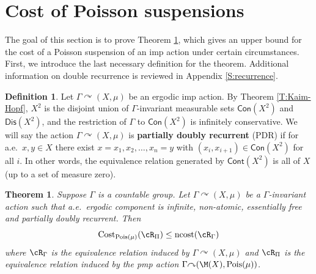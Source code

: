 \documentclass[12pt]{article}
\theoremstyle{plain}
\newtheorem{thm}{Theorem}[section]
\theoremstyle{definition}
\newtheorem{defn}{Definition}
\theoremstyle{remark}
\newtheorem{remark}{Remark}
\newcommand{\G}{\Gamma}
\newcommand\cost{{\operatorname{Cost}}}
\newcommand\Pois{\operatorname{Pois}}
\def\cc{{\curvearrowright}}
\begin{document}
\section{Cost of Poisson suspensions}\label{S:cost-Poisson}

The goal of this section is to prove Theorem \ref{T:ppp-cost}, which gives an upper bound for the cost of a Poisson suspension of an imp action under certain circumstances. First, we introduce the last necessary definition for the theorem.
Additional information on double recurrence is reviewed in Appendix \ref{S:recurrence}.

\begin{defn}
    Let $\G \cc (X,\mu)$ be an ergodic imp action. By Theorem \ref{T:Kaim-Hopf}, $X^2$ is the disjoint union of $\G$-invariant measurable sets $\mathsf{Con}(X^2)$ and $\mathsf{Dis}(X^2)$, and the restriction of $\G$ to $\mathsf{Con}(X^2)$ is infinitely conservative. We will say the action $\G \cc (X,\mu)$ is {\bf partially doubly recurrent} (PDR) if for a.e.\ $x,y \in X$ there exist $x=x_1,x_2,\ldots, x_n=y$ with $(x_i,x_{i+1})\in \mathsf{Con}(X^2)$ for all $i$. In other words, the equivalence relation generated by $\mathsf{Cont}(X^2)$ is all of $X$ (up to a set of measure zero). 
    
\end{defn}






\begin{thm}\label{T:ppp-cost} Suppose $\G$ is a countable group.
    Let $\G \cc (X,\mu)$ be a $\G$-invariant action such that a.e.\  ergodic component is infinite, non-atomic, essentially free and partially doubly recurrent. Then 
    $$\cost_{\Pois(\mu)}( \cR_\Pi)\le \operatorname{ncost}(\cR_\G)$$ where $\cR_\G$ is the equivalence relation induced by $\G \cc (X,\mu)$ and $\cR_\Pi$ is the equivalence relation induced by the pmp action $\G \cc(\M(X),\Pois(\mu))$.
\end{thm}
\end{document}
